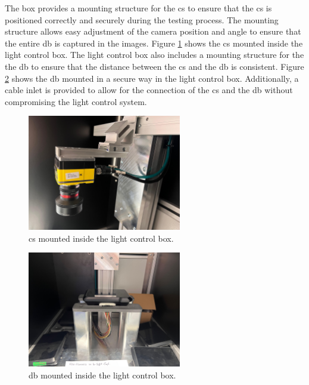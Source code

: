 The box provides a mounting structure for the \gls{cs} to ensure that the \gls{cs} is positioned correctly and securely during the testing process. The mounting structure allows easy adjustment of the camera position and angle to ensure that the entire \gls{db} is captured in the images. Figure \ref{Camera_Mounting} shows the \gls{cs} mounted inside the light control box. The light control box also includes a mounting structure for the the \gls{db} to ensure that the distance between the \gls{cs} and the \gls{db} is consistent. Figure \ref{db_Mounting} shows the \gls{db} mounted in a secure way in the light control box. Additionally, a cable inlet is provided to allow for the connection of the \gls{cs} and the \gls{db} without compromising the light control system.

\begin{figure}[!htb]
    \centering
    \includegraphics[width=0.6\textwidth]{Figures/Camera_Mounting.jpg}
    \caption{\gls{cs} mounted inside the light control box.}
    \label{Camera_Mounting}
\end{figure}

\begin{figure}[!htb]
    \centering
    \includegraphics[width=0.6\textwidth]{Figures/db_mounting.jpg}
    \caption{\gls{db} mounted inside the light control box.}
    \label{db_Mounting}
\end{figure}


